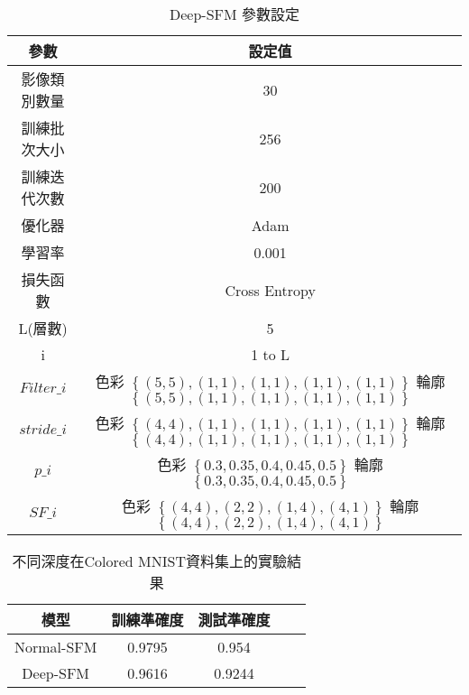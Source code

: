 \documentclass[class=NCU\_thesis, crop=false]{standalone}
\begin{document}
    \begin{table}[H]
        \centering
        \caption{Deep-SFM 參數設定}
        \label{tab:DeepColoredModelparameters}
        \begin{tabular}{| c | c |}
            \hline
            參數 & 設定值 \\
            \hline
            \hline
            影像類別數量 & 30 \\
            \hline
            訓練批次大小 & 256 \\
            \hline
            訓練迭代次數 & 200 \\
            \hline
            優化器 & Adam \\
            \hline
            學習率 & 0.001 \\
            \hline
            損失函數 & Cross Entropy \\
            \hline
            L(層數) & 5 \\
            \hline
            i & 1 to L \\
            \hline
            $Filter\_{i}$ & \makecell{色彩 $\left\{(5, 5), (1, 1), (1, 1), (1, 1), (1, 1)\right\}$ \\ 輪廓 $\left\{(5, 5), (1, 1), (1, 1), (1, 1), (1, 1)\right\}$ }\\
            \hline 
            $stride\_{i}$ & \makecell{色彩 $\left\{(4, 4), (1, 1), (1, 1), (1, 1), (1, 1)\right\}$ \\ 輪廓 $\left\{(4, 4), (1, 1), (1, 1), (1, 1), (1, 1)\right\}$ } \\
            \hline
            $p\_{i}$ & \makecell{色彩 $\left\{0.3, 0.35, 0.4, 0.45, 0.5\right\}$  \\ 輪廓 $\left\{0.3, 0.35, 0.4, 0.45, 0.5\right\}$ } \\
            \hline
            $SF\_{i}$ &  \makecell{色彩 $\left\{(4, 4), (2, 2), (1, 4), (4, 1)\right\}$ \\ 輪廓 $\left\{(4, 4), (2, 2), (1, 4), (4, 1)\right\}$ }  \\
            \hline 
        \end{tabular}
    \end{table}

    \begin{table}[H]
        \centering
        \caption{不同深度在Colored MNIST資料集上的實驗結果}
        \label{tab:diff-deep-experiment}
        \begin{tabular}{| c | c | c | c | c |}
            \hline
            模型 & 訓練準確度 & 測試準確度 \\
            \hline
            \hline
            Normal-SFM & 0.9795 & 0.954 \\
            Deep-SFM & 0.9616 & 0.9244  \\
            \hline
        \end{tabular}
    \end{table}
\end{document}
